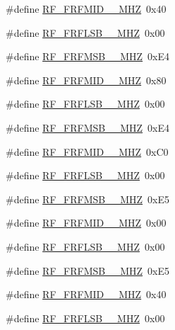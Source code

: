 \begin{DoxyCompactItemize}
\item 
\#define \mbox{\hyperlink{sx1276_regs-_fsk_8h_aa6875f66924d31b915390903c1fab25a}{R\+F\+\_\+\+F\+R\+F\+M\+I\+D\+\_\+\_\+\+M\+HZ}}~0x40
\item 
\#define \mbox{\hyperlink{sx1276_regs-_fsk_8h_a007ff670a860ed0968e2022a303bcaf5}{R\+F\+\_\+\+F\+R\+F\+L\+S\+B\+\_\+\_\+\+M\+HZ}}~0x00
\item 
\#define \mbox{\hyperlink{sx1276_regs-_fsk_8h_a9ec17583ae6938b5f9a1cdaadc5376b2}{R\+F\+\_\+\+F\+R\+F\+M\+S\+B\+\_\+\_\+\+M\+HZ}}~0x\+E4
\item 
\#define \mbox{\hyperlink{sx1276_regs-_fsk_8h_adbcd8c0ac344d059c366381b5c72c058}{R\+F\+\_\+\+F\+R\+F\+M\+I\+D\+\_\+\_\+\+M\+HZ}}~0x80
\item 
\#define \mbox{\hyperlink{sx1276_regs-_fsk_8h_addbb5e073b3813270c984ef1413be95b}{R\+F\+\_\+\+F\+R\+F\+L\+S\+B\+\_\+\_\+\+M\+HZ}}~0x00
\item 
\#define \mbox{\hyperlink{sx1276_regs-_fsk_8h_ad149370afbff5b09fdf963efb76142fb}{R\+F\+\_\+\+F\+R\+F\+M\+S\+B\+\_\+\_\+\+M\+HZ}}~0x\+E4
\item 
\#define \mbox{\hyperlink{sx1276_regs-_fsk_8h_ace60596f70acafb3b57d31bc658e484e}{R\+F\+\_\+\+F\+R\+F\+M\+I\+D\+\_\+\_\+\+M\+HZ}}~0x\+C0
\item 
\#define \mbox{\hyperlink{sx1276_regs-_fsk_8h_a18c46e7d8870d1d8c0a82b8f67be4d5a}{R\+F\+\_\+\+F\+R\+F\+L\+S\+B\+\_\+\_\+\+M\+HZ}}~0x00
\item 
\#define \mbox{\hyperlink{sx1276_regs-_fsk_8h_ad7c62f39d583a8fcd4c15374d8bee1f6}{R\+F\+\_\+\+F\+R\+F\+M\+S\+B\+\_\+\_\+\+M\+HZ}}~0x\+E5
\item 
\#define \mbox{\hyperlink{sx1276_regs-_fsk_8h_af4f0e5b8ac05cd73f32e19dd96ae34cf}{R\+F\+\_\+\+F\+R\+F\+M\+I\+D\+\_\+\_\+\+M\+HZ}}~0x00
\item 
\#define \mbox{\hyperlink{sx1276_regs-_fsk_8h_a806e977236285fcd65eb5c5028a165e5}{R\+F\+\_\+\+F\+R\+F\+L\+S\+B\+\_\+\_\+\+M\+HZ}}~0x00
\item 
\#define \mbox{\hyperlink{sx1276_regs-_fsk_8h_a34b7c4220125ea6aa40f38ac71fc8eab}{R\+F\+\_\+\+F\+R\+F\+M\+S\+B\+\_\+\_\+\+M\+HZ}}~0x\+E5
\item 
\#define \mbox{\hyperlink{sx1276_regs-_fsk_8h_a1bceebac3751bf54d8cc4e4320514a3e}{R\+F\+\_\+\+F\+R\+F\+M\+I\+D\+\_\+\_\+\+M\+HZ}}~0x40
\item 
\#define \mbox{\hyperlink{sx1276_regs-_fsk_8h_aab684a457bd2e8952dc0f8940715bfe9}{R\+F\+\_\+\+F\+R\+F\+L\+S\+B\+\_\+\_\+\+M\+HZ}}~0x00

\end{DoxyCompactItemize}
